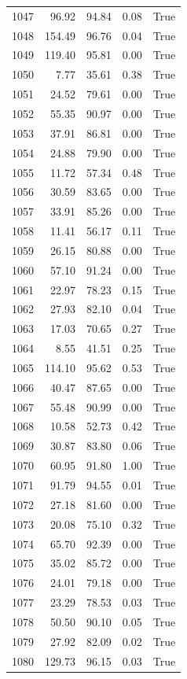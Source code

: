 \begin{longtable}{rrrrr}
1047 & 96.92 & 94.84 & 0.08 & True \\
1048 & 154.49 & 96.76 & 0.04 & True \\
1049 & 119.40 & 95.81 & 0.00 & True \\
1050 & 7.77 & 35.61 & 0.38 & True \\
1051 & 24.52 & 79.61 & 0.00 & True \\
1052 & 55.35 & 90.97 & 0.00 & True \\
1053 & 37.91 & 86.81 & 0.00 & True \\
1054 & 24.88 & 79.90 & 0.00 & True \\
1055 & 11.72 & 57.34 & 0.48 & True \\
1056 & 30.59 & 83.65 & 0.00 & True \\
1057 & 33.91 & 85.26 & 0.00 & True \\
1058 & 11.41 & 56.17 & 0.11 & True \\
1059 & 26.15 & 80.88 & 0.00 & True \\
1060 & 57.10 & 91.24 & 0.00 & True \\
1061 & 22.97 & 78.23 & 0.15 & True \\
1062 & 27.93 & 82.10 & 0.04 & True \\
1063 & 17.03 & 70.65 & 0.27 & True \\
1064 & 8.55 & 41.51 & 0.25 & True \\
1065 & 114.10 & 95.62 & 0.53 & True \\
1066 & 40.47 & 87.65 & 0.00 & True \\
1067 & 55.48 & 90.99 & 0.00 & True \\
1068 & 10.58 & 52.73 & 0.42 & True \\
1069 & 30.87 & 83.80 & 0.06 & True \\
1070 & 60.95 & 91.80 & 1.00 & True \\
1071 & 91.79 & 94.55 & 0.01 & True \\
1072 & 27.18 & 81.60 & 0.00 & True \\
1073 & 20.08 & 75.10 & 0.32 & True \\
1074 & 65.70 & 92.39 & 0.00 & True \\
1075 & 35.02 & 85.72 & 0.00 & True \\
1076 & 24.01 & 79.18 & 0.00 & True \\
1077 & 23.29 & 78.53 & 0.03 & True \\
1078 & 50.50 & 90.10 & 0.05 & True \\
1079 & 27.92 & 82.09 & 0.02 & True \\
1080 & 129.73 & 96.15 & 0.03 & True \\

\end{longtable}
